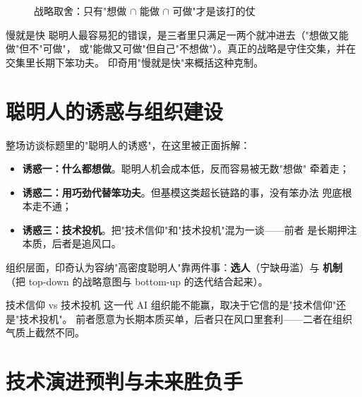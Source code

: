 \documentclass[a4paper]{article}
\begin{document}
\begin{figure}[H]
\centering
{}
\caption{战略取舍：只有"想做 $\cap$ 能做 $\cap$ 可做"才是该打的仗}
\end{figure}

\begin{knowledgebox}{慢就是快}
聪明人最容易犯的错误，是三者里只满足一两个就冲进去（"想做又能做"但不"可做"，
或"能做又可做"但自己"不想做"）。真正的战略是守住交集，并在交集里长期下笨功夫。
印奇用"慢就是快"来概括这种克制。
\end{knowledgebox}

\section{聪明人的诱惑与组织建设}

整场访谈标题里的"聪明人的诱惑"，在这里被正面拆解：

\begin{itemize}
    \item \textbf{诱惑一：什么都想做}。聪明人机会成本低，反而容易被无数"想做"
        牵着走；
    \item \textbf{诱惑二：用巧劲代替笨功夫}。但基模这类超长链路的事，没有笨办法
        兜底根本走不通；
    \item \textbf{诱惑三：技术投机}。把"技术信仰"和"技术投机"混为一谈——前者
        是长期押注本质，后者是追风口。
\end{itemize}

组织层面，印奇认为容纳"高密度聪明人"靠两件事：\textbf{选人}（宁缺毋滥）与
\textbf{机制}（把 top-down 的战略意图与 bottom-up 的迭代结合起来）。

\begin{importantbox}{技术信仰 vs 技术投机}
这一代 AI 组织能不能赢，取决于它信的是"技术信仰"还是"技术投机"。
前者愿意为长期本质买单，后者只在风口里套利——二者在组织气质上截然不同。
\end{importantbox}

\section{技术演进预判与未来胜负手}
\end{document}
